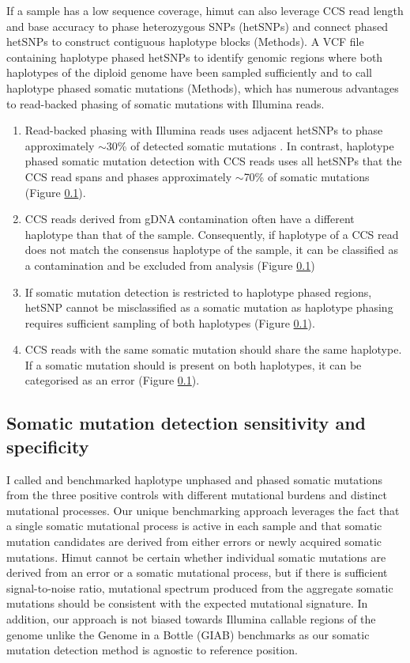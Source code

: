 If a sample has a low sequence coverage, himut can also leverage CCS read length and base accuracy to phase heterozygous SNPs (hetSNPs) and connect phased hetSNPs to construct contiguous haplotype blocks (Methods). A VCF file containing haplotype phased hetSNPs to identify genomic regions where both haplotypes of the diploid genome have been sampled sufficiently and to call haplotype phased somatic mutations (Methods), which has numerous advantages to read-backed phasing of somatic mutations with Illumina reads.


\begin{enumerate}
\item Read-backed phasing with Illumina reads uses adjacent hetSNPs to phase approximately $\sim$30\% of detected somatic mutations \cite{Nik-Zainal2012-nz}. In contrast, haplotype phased somatic mutation detection with CCS reads uses all hetSNPs that the CCS read spans and phases approximately $\sim$70\% of somatic mutations (Figure \ref{}). 
\item CCS reads derived from gDNA contamination often have a different haplotype than that of the sample. Consequently, if haplotype of a CCS read does not match the consensus haplotype of the sample, it can be classified as a contamination and be excluded from analysis (Figure \ref{})
\item If somatic mutation detection is restricted to haplotype phased regions, hetSNP cannot be misclassified as a somatic mutation as haplotype phasing requires sufficient sampling of both haplotypes (Figure \ref{}). 
\item CCS reads with the same somatic mutation should share the same haplotype. If a somatic mutation should is present on both haplotypes, it can be categorised as an error (Figure \ref{}). 
\end{enumerate}


\subsection{Somatic mutation detection sensitivity and specificity}

I called and benchmarked haplotype unphased and phased somatic mutations from the three positive controls with different mutational burdens and distinct mutational processes. Our unique benchmarking approach leverages the fact that a single somatic mutational process is active in each sample and that somatic mutation candidates are derived from either errors or newly acquired somatic mutations. Himut cannot be certain whether individual somatic mutations are derived from an error or a somatic mutational process, but if there is sufficient signal-to-noise ratio, mutational spectrum produced from the aggregate somatic mutations should be consistent with the expected mutational signature. In addition, our approach is not biased towards Illumina callable regions of the genome unlike the Genome in a Bottle (GIAB) benchmarks \cite{} as our somatic mutation detection method is agnostic to reference position. 

